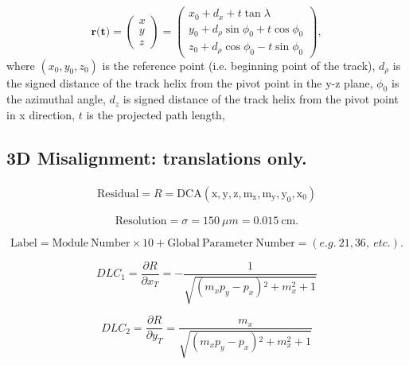 \documentclass[a4paper,11pt]{article}
\begin{document}
\begin{equation}
\textbf{r(t)} = \begin{pmatrix} x \\ y \\ z \end{pmatrix} = \begin{pmatrix} x_0 + d_x + t\tan\lambda \  \\ y_0 + d_\rho\sin\phi_0 + t\cos\phi_0 \\ z_0 + d_\rho \cos\phi_0 - t \sin\phi_0 \end{pmatrix},
\end{equation}
where $(x_0, y_0, z_0)$ is the reference point (i.e. beginning point of the track), $d_\rho$ is the signed distance of the track helix from the pivot point in the y-z plane, $\phi_0$ is the azimuthal angle, $d_z$ is signed distance of the track helix from the pivot point in x direction, $t$ is the projected path length, 


\clearpage

\subsection{3D Misalignment: translations only.}

\begin{equation}
\begin{split}
\mathrm{Residual} = R = \mathrm{DCA(x, y, z, m_x, m_y, y_0, x_0)} 
\end{split}
\end{equation}

\begin{equation}	
\mathrm{Resolution} = \sigma = 150 \ \mu m = 0.015 \ \mathrm{cm}.
\end{equation}

\begin{equation}	
\mathrm{Label}= \mathrm{Module \ Number} \times 10 + \mathrm{Global \ Parameter \ Number} = (e.g. \ 21, 36, \ etc.).
\end{equation}

\begin{equation}
DLC_1 = \frac{\partial R}{\partial x_T} =   -\frac{1}{\sqrt{\left(m_x p_y-p_x\right){}^2+m_x^2+1}}
\end{equation}

\begin{equation}
DLC_2 = \frac{ \partial R}{\partial y_T} =  \frac{m_x}{\sqrt{\left(m_x p_y-p_x\right){}^2+m_x^2+1}} 
\end{equation}
\end{document}
